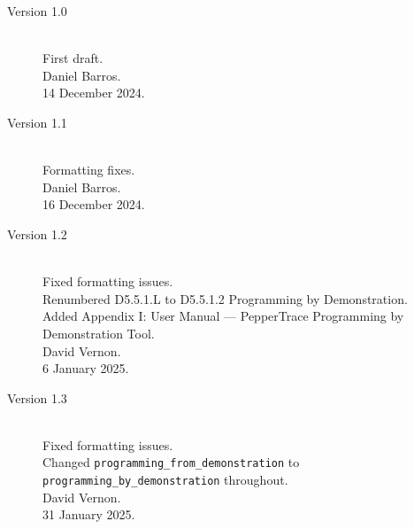 \documentclass{CSSRforAfrica}
\begin{document}
\begin{description}

\item [Version 1.0]~\\
First draft. \\
Daniel Barros. \\                                   
14 December 2024.                                                    
\item [Version 1.1]~\\
Formatting fixes.  \\
Daniel Barros. \\                                    
16 December 2024.   
\item [Version 1.2]~\\
Fixed formatting issues.  \\
Renumbered D5.5.1.L to D5.5.1.2  Programming by Demonstration.\\
Added Appendix I: User Manual --- PepperTrace Programming by Demonstration Tool.\\
David Vernon. \\                                   
6 January 2025.   
\item [Version 1.3]~\\
Fixed formatting issues.  \\
Changed \texttt{programming\_from\_demonstration}  to \texttt{programming\_by\_demonstration} throughout.\\
David Vernon. \\                                   
31 January 2025.   

\end{description}
\end{document}
